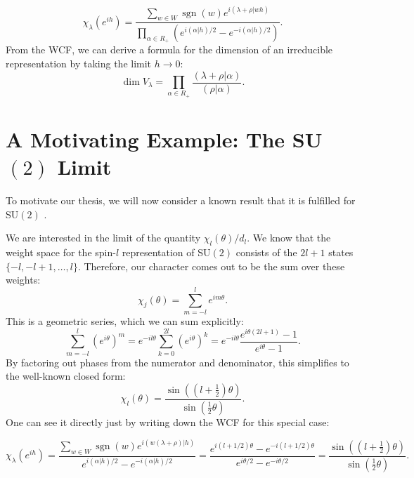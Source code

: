 \documentclass[11pt, a4paper]{article}
\DeclareMathOperator{\sgn}{sgn}
\theoremstyle{definition}
\theoremstyle{remark}
\begin{document}
\begin{equation}
    \label{eq:wcf}
    \chi_\lambda(e^{ih}) = \frac{\sum_{w \in W} \sgn(w) e^{i(\lambda + \rho|w h)}}{\prod_{\alpha \in R_+} (e^{i(\alpha|h)/2} - e^{-i(\alpha|h)/2})}.
\end{equation}
From the WCF, we can derive a formula for the dimension of an irreducible representation by taking the limit $h \to 0$:
\begin{equation}
    \label{eq:dimension_formula}
    \dim V_{\lambda} = \prod_{\alpha \in R_+} \frac{(\lambda + \rho|\alpha)}{(\rho|\alpha)}.
\end{equation}


\section{A Motivating Example: The SU$(2)$ Limit}
\label{sec:su2_example}

To motivate our thesis, we will now consider a known\cite{dulianRandomMatrixModel2024} result that it is fulfilled for SU$(2)$ . 

We are interested in the limit of the quantity $\chi_l(\theta)/d_l$. We know that the weight space for the spin-$l$ representation of SU$(2)$ consists of the $2l+1$ states $\{ -l, -l+1, \dots, l \}$. Therefore, our character comes out to be the sum over these weights:
\begin{equation}
    \chi_j(\theta) = \sum_{m=-l}^{l} e^{im\theta}.
\end{equation}
This is a geometric series, which we can sum explicitly:
\begin{equation}
    \sum_{m=-l}^{l} (e^{i\theta})^m = e^{-il\theta} \sum_{k=0}^{2l} (e^{i\theta})^k = e^{-il\theta} \frac{e^{i\theta(2l+1)}-1}{e^{i\theta}-1}.
\end{equation}
By factoring out phases from the numerator and denominator, this simplifies to the well-known closed form:
\begin{equation}
    \chi_l(\theta) = \frac{\sin\left((l+\frac{1}{2})\theta\right)}{\sin(\frac{1}{2}\theta)}.
\end{equation}
One can see it directly just by writing down the WCF for this special case:

\begin{equation}
    \chi_\lambda(e^{ih}) = \frac{\sum_{w \in W} \sgn(w) e^{i(w(\lambda + \rho)|h)}}{ e^{i(\alpha|h)/2} - e^{-i(\alpha|h)/2} } = \frac{e^{i(l+1/2)\theta} - e^{-i(l+1/2)\theta}}{e^{i\theta/2} - e^{-i\theta/2}} = \frac{\sin\left((l+\frac{1}{2})\theta\right)}{\sin(\frac{1}{2}\theta)}.
\end{equation}
\end{document}
